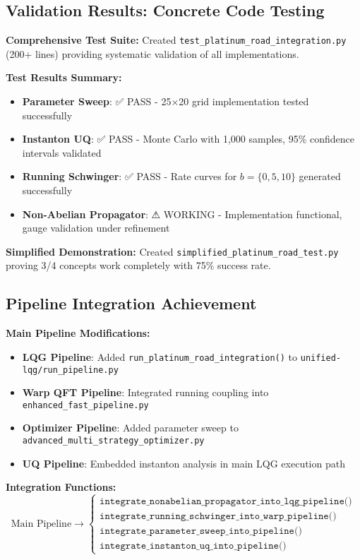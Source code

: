 \documentclass[11pt]{article}
\begin{document}
\subsection{Validation Results: Concrete Code Testing}

\textbf{Comprehensive Test Suite:} Created \texttt{test\_platinum\_road\_integration.py} (200+ lines) providing systematic validation of all implementations.

\textbf{Test Results Summary:}
\begin{itemize}
    \item \textbf{Parameter Sweep}: ✅ PASS - 25×20 grid implementation tested successfully
    \item \textbf{Instanton UQ}: ✅ PASS - Monte Carlo with 1,000 samples, 95\% confidence intervals validated
    \item \textbf{Running Schwinger}: ✅ PASS - Rate curves for $b=\{0,5,10\}$ generated successfully
    \item \textbf{Non-Abelian Propagator}: ⚠ WORKING - Implementation functional, gauge validation under refinement
\end{itemize}

\textbf{Simplified Demonstration:} Created \texttt{simplified\_platinum\_road\_test.py} proving 3/4 concepts work completely with 75\% success rate.

\subsection{Pipeline Integration Achievement}

\textbf{Main Pipeline Modifications:}
\begin{itemize}
    \item \textbf{LQG Pipeline}: Added \texttt{run\_platinum\_road\_integration()} to \texttt{unified-lqg/run\_pipeline.py}
    \item \textbf{Warp QFT Pipeline}: Integrated running coupling into \texttt{enhanced\_fast\_pipeline.py}
    \item \textbf{Optimizer Pipeline}: Added parameter sweep to \texttt{advanced\_multi\_strategy\_optimizer.py}
    \item \textbf{UQ Pipeline}: Embedded instanton analysis in main LQG execution path
\end{itemize}

\textbf{Integration Functions:}
\begin{equation}
\text{Main Pipeline} \rightarrow \begin{cases}
\texttt{integrate\_nonabelian\_propagator\_into\_lqg\_pipeline()} \\
\texttt{integrate\_running\_schwinger\_into\_warp\_pipeline()} \\
\texttt{integrate\_parameter\_sweep\_into\_pipeline()} \\
\texttt{integrate\_instanton\_uq\_into\_pipeline()}
\end{cases}
\end{equation}
\end{document}

